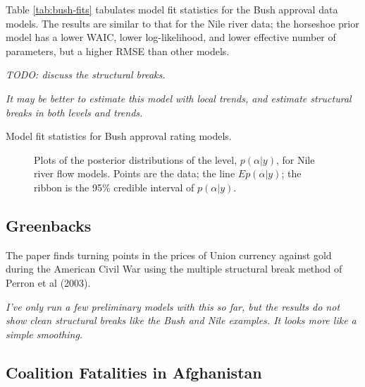 \documentclass{article}
\begin{document}
Table \ref{tab:bush-fits} tabulates model fit statistics for the Bush approval data models. 
The results are similar to that for the Nile river data; the horseshoe prior model has a lower WAIC, lower log-likelihood, and lower effective number of parameters, but a higher RMSE than other models.

\textit{TODO: discuss the structural breaks.}

\textit{It may be better to estimate this model with local trends, and estimate structural breaks in both levels and trends.}

\begin{table}[htpb]
  \centering
  
  \caption{Model fit statistics for Bush approval rating models.}
  \label{tab:bush-fits}
\end{table}

\begin{figure}[htpb]
  \centering
  \begin{subfigure}{1.0\textwidth}
    \caption{}
    \label{fig:bush1}
  \end{subfigure}
  \begin{subfigure}{1.0\textwidth}
    \caption{}
    \label{fig:bush2}
  \end{subfigure}
  \caption{Plots of the posterior distributions of the level, $p(\alpha | y)$, for Nile river flow models. Points are the data; the line $E p(\alpha | y)$; the ribbon is the 95\% credible interval of $p(\alpha | y)$.}
  \label{fig:bush-posterior}
\end{figure}


\subsection{Greenbacks}
\label{sec:greenbacks}

The paper \textcite{WillardGuinnaneEtAl1996} finds turning points in the prices of Union currency against gold during the American Civil War using the multiple structural break method of Perron et al (2003).

\textit{I've only run a few preliminary models with this so far, but the results do not show clean structural breaks like the Bush and Nile examples. It looks more like a simple smoothing.}

\subsection{Coalition Fatalities in Afghanistan}
\label{sec:coal-fatal-afgh}
\end{document}
